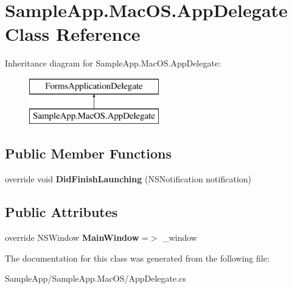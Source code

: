 \hypertarget{class_sample_app_1_1_mac_o_s_1_1_app_delegate}{}\section{Sample\+App.\+Mac\+O\+S.\+App\+Delegate Class Reference}
\label{class_sample_app_1_1_mac_o_s_1_1_app_delegate}
Inheritance diagram for Sample\+App.\+Mac\+O\+S.\+App\+Delegate\+:\begin{figure}[H]
\begin{center}
\leavevmode
\includegraphics[height=2.000000cm]{class_sample_app_1_1_mac_o_s_1_1_app_delegate}
\end{center}
\end{figure}
\subsection*{Public Member Functions}
\begin{DoxyCompactItemize}
\item 
\mbox{\label{class_sample_app_1_1_mac_o_s_1_1_app_delegate_ac47a7781033f5a5bc091602a654b6ab8}} 
override void {\bfseries Did\+Finish\+Launching} (N\+S\+Notification notification)
\end{DoxyCompactItemize}
\subsection*{Public Attributes}
\begin{DoxyCompactItemize}
\item 
\mbox{\label{class_sample_app_1_1_mac_o_s_1_1_app_delegate_a218013ee231f0a24c55efb4319f80c9a}} 
override N\+S\+Window {\bfseries Main\+Window} =$>$ \+\_\+window
\end{DoxyCompactItemize}


The documentation for this class was generated from the following file\+:\begin{DoxyCompactItemize}
\item 
Sample\+App/\+Sample\+App.\+Mac\+O\+S/App\+Delegate.\+cs\end{DoxyCompactItemize}
